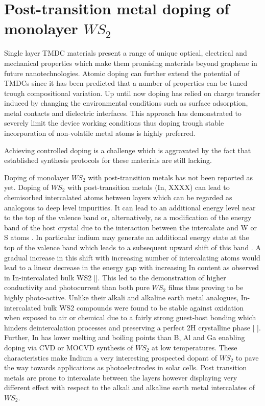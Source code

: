 \chapter{Post-transition metal doping of monolayer $WS_2$}

Single layer TMDC materials present a range of unique optical, electrical and mechanical properties which make them promising materials beyond graphene in future nanotechnologies.
Atomic doping can further extend the potential of TMDCs since it has been predicted that a number of properties can be tuned trough compositional variation. Up until now doping has relied on charge transfer induced by changing the environmental conditions such as surface adsorption, metal contacts and dielectric interfaces. This approach has demonstrated to severely limit the device working conditions thus doping trough stable incorporation of non-volatile metal atoms is highly preferred.

Achieving controlled doping is a challenge which is aggravated by the fact that established synthesis protocols for these materials are still lacking.

Doping of monolayer $WS_2$ with post-transition metals has not been reported as yet. Doping of $WS_2$ with post-transition metals (In, XXXX) can lead to chemisorbed intercalated atoms between layers which can be regarded as analogous to deep level impurities. It can lead to an additional energy level near to the top of the valence band or, alternatively, as a modification of the energy band of the host crystal due to the interaction between the intercalate and W or S atoms \cite{Yacobi1979}\cite{Yacobi1979a}. In particular indium may generate an additional energy state at the top of the valence band which leads to a subsequent upward shift of this band \cite{Deshpande2001}. A gradual increase in this shift with increasing number of intercalating atoms would lead to a linear decrease in the energy gap with increasing In content as observed in In-intercalated bulk WS2 []. This led to the demonstration of higher conductivity and photocurrent than both pure $WS_2$ films thus proving to be highly photo-active. 
Unlike their alkali and alkaline earth metal analogues, In-intercalated bulk WS2 compounds were found to be stable against oxidation when exposed to air or chemical due to a fairly strong guest-host bonding which hinders deintercalation processes and preserving a perfect 2H crystalline phase [ ]. 
Further, In has lower melting and boiling points than B, Al and Ga enabling doping via CVD or MOCVD synthesis of $WS_2$ at low temperatures.
These characteristics make Indium a very interesting prospected dopant of $WS_2$ to pave the way towards applications as photoelectrodes in solar cells.
Post transition metals are prone to intercalate between the layers however displaying very different effect with respect to the alkali and alkaline earth metal intercalates of $WS_2$.

